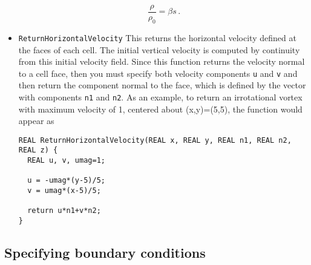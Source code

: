 \documentclass[12pt,oneside]{article}
\begin{document}
\begin{itemize}
\[\frac{\rho}{\rho_0}=\beta s\,.\]
\item \verb+ReturnHorizontalVelocity+ This returns the horizontal velocity defined at the faces of each cell.  The initial vertical velocity is
computed by continuity from this initial velocity field.  Since this function returns the velocity normal to a cell face, then
you must specify both velocity components \verb+u+ and \verb+v+ and then return the component normal to the face, which is
defined by the vector with components \verb+n1+ and \verb+n2+.  As an example, to return an irrotational vortex with
maximum velocity of 1, centered
about (x,y)=(5,5), the function would appear as
\begin{verbatim}
REAL ReturnHorizontalVelocity(REAL x, REAL y, REAL n1, REAL n2, REAL z) {
  REAL u, v, umag=1;

  u = -umag*(y-5)/5;
  v = umag*(x-5)/5;

  return u*n1+v*n2;
}
\end{verbatim}
\end{itemize}

\subsection{Specifying boundary conditions} \label{sec:boundary}
\end{document}
